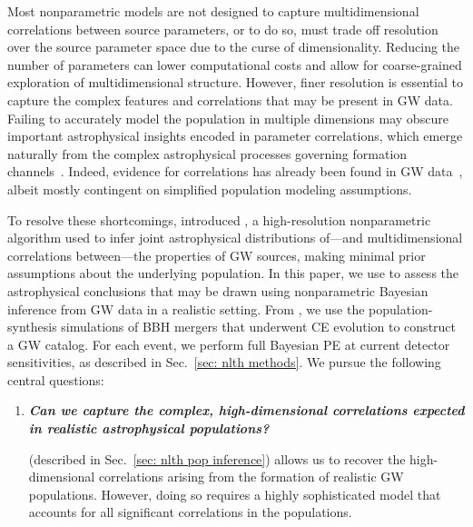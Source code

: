 \begin{refsection}
Most nonparametric models are not designed to capture multidimensional correlations between source parameters, or to do so, must trade off resolution over the source parameter space due to the curse of dimensionality. Reducing the number of parameters can lower computational costs and allow for coarse-grained exploration of multidimensional structure. However, finer resolution is essential to capture the complex features and correlations that may be present in \ac{GW} data.
Failing to accurately model the population in multiple dimensions may obscure important astrophysical insights encoded in parameter correlations, which emerge naturally from the complex astrophysical processes governing formation channels~\citep{Bavera:2020uch,Bavera:2022mef,Gerosa:2021mno,Santini:2023ukl,Baibhav:2022qxm,vanSon:2021zpk,Zevin:2022wrw,Broekgaarden:2022nst,Bavera:2020inc}. Indeed, evidence for correlations has already been found in \ac{GW} data~\citep{Callister:2021fpo, Biscoveanu:2022qac, Adamcewicz:2022hce, Heinzel:2023hlb, Heinzel:2024hva, Franciolini:2022iaa, Ray:2024hos,Antonini:2024het,Hussain:2024qzl,Pierra:2024fbl,Tiwari:2021yvr,Li:2023yyt}, albeit mostly contingent on simplified population modeling assumptions.

To resolve these shortcomings, \citet{Heinzel:2024jlc, Heinzel:2024hva} introduced \PixelPop, a high-resolution nonparametric algorithm used to infer joint astrophysical distributions of---and multidimensional correlations between---the properties of GW sources, making minimal prior assumptions about the underlying population. In this paper, we use \PixelPop to assess the astrophysical conclusions that may be drawn using nonparametric Bayesian inference from GW data in a realistic setting. From \citet{Zevin:2020gbd}, we use the population-synthesis simulations of \ac{BBH} mergers that underwent \ac{CE} evolution to construct a GW catalog. For each event, we perform full Bayesian \ac{PE} at current detector sensitivities, as described in Sec.~\ref{sec: nlth methods}. We pursue the following central questions:

\begin{enumerate}
\item \textit{\textbf{Can we capture the complex, high-dimensional correlations expected in realistic astrophysical populations?}} 

\PixelPop (described in Sec.~\ref{sec: nlth pop inference}) allows us to recover the high-dimensional correlations arising from the formation of realistic \ac{GW} populations. However, doing so requires a highly sophisticated model that accounts for all significant correlations in the populations.


\end{enumerate}
\end{refsection}
